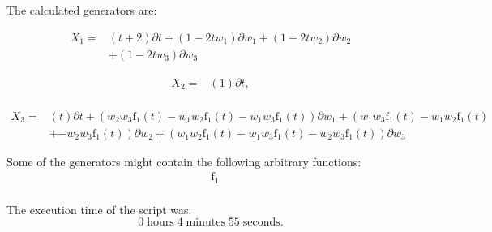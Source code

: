 \noindent The calculated generators are:

\begin{align*}
X_{1}=&\left(t+2 \right)\partial t+\left(1- 2 t w_{1} \right)\partial w_{1}+\left(1- 2 t w_{2} \right)\partial w_{2}\\
&+\left(1- 2 t w_{3} \right)\partial w_{3}
\end{align*}

\begin{align*}
X_{2}=&\left(1 \right)\partial t,\\
\end{align*}

\begin{align*}
X_{3}=&\left(t \right)\partial t+\left(w_{2} w_{3} \operatorname{f_{1}}{\left(t \right)}- w_{1} w_{2} \operatorname{f_{1}}{\left(t \right)}- w_{1} w_{3} \operatorname{f_{1}}{\left(t \right)} \right)\partial w_{1}+\left(w_{1} w_{3} \operatorname{f_{1}}{\left(t \right)}- w_{1} w_{2} \operatorname{f_{1}}{\left(t \right)}\right.\\
&+\left.- w_{2} w_{3} \operatorname{f_{1}}{\left(t \right)} \right)\partial w_{2}+\left(w_{1} w_{2} \operatorname{f_{1}}{\left(t \right)}- w_{1} w_{3} \operatorname{f_{1}}{\left(t \right)}- w_{2} w_{3} \operatorname{f_{1}}{\left(t \right)} \right)\partial w_{3}
\end{align*}



\noindent Some of the generators might contain the following arbitrary functions:
\begin{align*}
&\operatorname{f_{1}}\\
\end{align*}

The execution time of the script was:
$$0\;\mathrm{hours}\;4\;\mathrm{minutes}\;55 \;\mathrm{seconds}.$$
